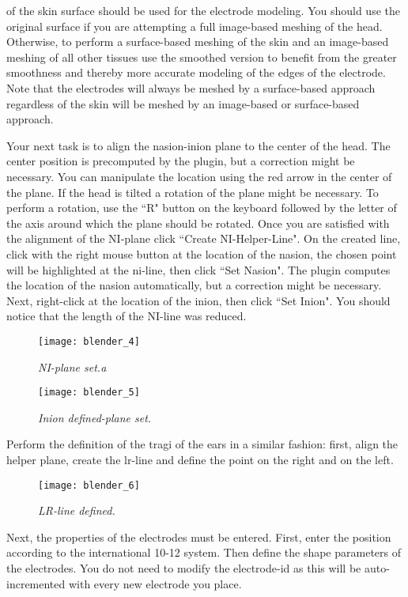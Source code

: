 of the skin surface should be used for the electrode modeling. You should use the original surface
if you are attempting a full image-based meshing of the head. Otherwise, to perform a surface-based
meshing of the skin and an image-based meshing of all other tissues use the smoothed version to
benefit from the greater smoothness and thereby more accurate modeling of the edges of the electrode.
Note that the electrodes will always be meshed by a surface-based approach regardless of the skin
will be meshed by an image-based or surface-based approach.\par
Your next task is to align the nasion-inion plane to the center of the head. The center position
is precomputed by the plugin, but a correction might be necessary. You can manipulate the location
using the red arrow in the center of the plane. If the head is tilted a rotation of the plane might
be necessary. To perform a rotation, use the ``R" button on the keyboard followed by the letter of
the axis around which the plane should be rotated. Once you are satisfied with the alignment of the
NI-plane click ``Create NI-Helper-Line". On the created line, click with the right mouse button
at the location of the nasion, the chosen point will be highlighted at the ni-line, then click 
``Set Nasion". The plugin computes the location of the nasion automatically, but a correction might
be necessary. Next, right-click at the location of the inion, then click ``Set Inion". You should
notice that the length of the NI-line was reduced.
\begin{figure}[H]
   \centering
   \texttt{[image: blender\_4]}
   \caption{\emph{NI-plane set.a}}
\end{figure}
\begin{figure}[H]
   \centering
   \texttt{[image: blender\_5]}
   \caption{\emph{Inion defined-plane set.}}
\end{figure}
Perform the definition of the tragi of the ears in a similar fashion: first, align the helper plane,
create the lr-line and define the point on the right and on the left.
\begin{figure}[H]
   \centering
   \texttt{[image: blender\_6]}
   \caption{\emph{LR-line defined.}}
\end{figure}
Next, the properties of the electrodes must be entered. First, enter the position according to the
international 10-12 system. Then define the shape parameters of the electrodes. You do not need to
modify the electrode-id as this will be auto-incremented with every new electrode you place.\par
